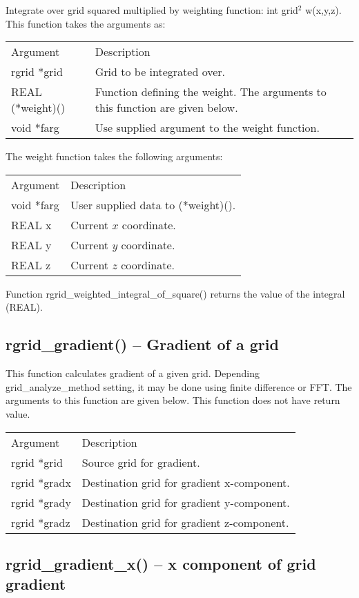 \documentclass[12pt,letterpaper]{report}
\begin{document}
Integrate over grid squared multiplied by weighting function: int grid$^2$ w(x,y,z). This function takes the arguments as:
\begin{longtable}{p{} p{}}
Argument & Description\\
\cline{1-2}
rgrid *grid & Grid to be integrated over.\\
REAL (*weight)() & Function defining the weight. The arguments to this function are given below.\\
void *farg & Use supplied argument to the weight function.\\
\end{longtable}
\noindent
The weight function takes the following arguments:
\begin{longtable}{p{} p{}}
Argument & Description\\
\cline{1-2}
void *farg & User supplied data to (*weight)().\\
REAL x & Current $x$ coordinate.\\
REAL y & Current $y$ coordinate.\\
REAL z & Current $z$ coordinate.\\
\end{longtable}
\noindent
Function rgrid\_weighted\_integral\_of\_square() returns the value of the integral (REAL).

\subsection{rgrid\_gradient() -- Gradient of a grid}

This function calculates gradient of a given grid. Depending grid\_analyze\_method setting, it may be done using finite difference or FFT. The arguments to this function are given below. This function does not have return value.\\
\begin{longtable}{p{} p{}}
Argument & Description\\
\cline{1-2}
rgrid *grid & Source grid for gradient.\\
rgrid *gradx & Destination grid for gradient x-component.\\
rgrid *grady & Destination grid for gradient y-component.\\
rgrid *gradz & Destination grid for gradient z-component.\\
\end{longtable}

\subsection{rgrid\_gradient\_x() -- x component of grid gradient}
\end{document}
